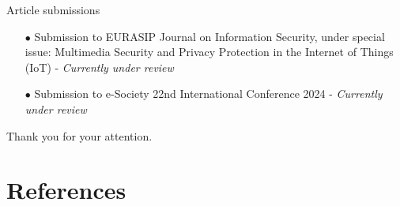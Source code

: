 \documentclass[xcolor={svgnames},compress,aspectratio=169]{beamer}
\begin{document}

\begin{frame}{Article submissions}
    \begin{itemize}
        \item[$\bullet$]
        Submission to EURASIP Journal on Information Security, under special issue: Multimedia
        Security and Privacy Protection in the Internet of Things (IoT) - \textit{Currently under review}
        \item[$\bullet$]
        Submission to e-Society 22nd International Conference 2024 - \textit{Currently under review}
    \end{itemize}
\end{frame}


\begin{frame}
    \begin{center}
        {\large Thank you for your attention.}
    \end{center}
\end{frame}

\section*{References}

\begin{frame}[allowframebreaks]
    
    
\end{frame}
\end{document}
